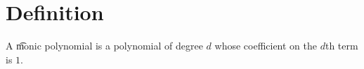 
\section*{Definition}

A \t{monic polynomial} is a polynomial of degree $d$ whose coefficient on the $d$th term is $1$.

\blankpage